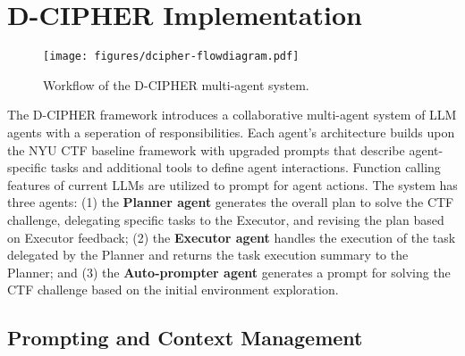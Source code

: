 \section{D-CIPHER Implementation} \label{sec:implementation}

\begin{figure*}[htpb]
    \centering
    \texttt{[image: figures/dcipher-flowdiagram.pdf]}
    \caption{Workflow of the D-CIPHER multi-agent system.}
    \label{fig:workflow}
\end{figure*}


The D-CIPHER framework introduces a collaborative multi-agent system of LLM agents with a seperation of responsibilities. Each agent's architecture builds upon the NYU CTF baseline framework \cite{shao2024nyu} with upgraded prompts that describe agent-specific tasks and additional tools to define agent interactions. Function calling features of current LLMs are utilized to prompt for agent actions.  The system has three agents:
(1) the \textbf{Planner agent} generates the overall plan to solve the CTF challenge, delegating specific tasks to the Executor, and revising the plan based on Executor feedback;
(2) the \textbf{Executor agent} handles the execution of the task delegated by the Planner and returns the task execution summary to the Planner;
and (3) the \textbf{Auto-prompter agent} generates a prompt for solving the CTF challenge based on the initial environment exploration.

\subsection{Prompting and Context Management}

